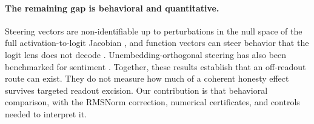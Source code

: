 \paragraph{The remaining gap is behavioral and quantitative.}
Steering vectors are non-identifiable up to perturbations in the null space of the full activation-to-logit Jacobian \citep{venkatesh2026nonid}, and function vectors can steer behavior that the logit lens does not decode \citep{nadaf2026function}. Unembedding-orthogonal steering has also been benchmarked for sentiment \citep{hughvd2024benchmark}. Together, these results establish that an off-readout route can exist. They do not measure how much of a coherent honesty effect survives targeted readout excision. Our contribution is that behavioral comparison, with the RMSNorm correction, numerical certificates, and controls needed to interpret it.
